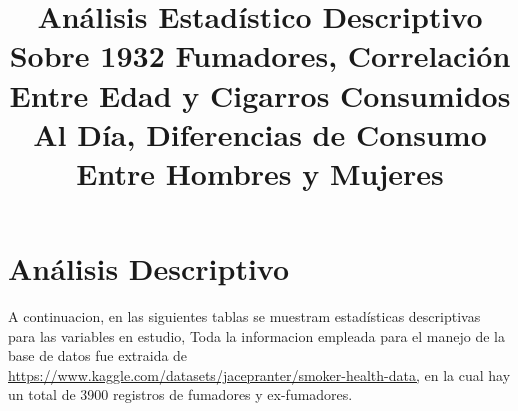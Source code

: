 \documentclass[
  stu,
  longtable,
  nolmodern,
  notxfonts,
  notimes,
  colorlinks=true,linkcolor=blue,citecolor=blue,urlcolor=blue]{apa7}
\title{Análisis Estadístico Descriptivo Sobre 1932 Fumadores,
Correlación Entre Edad y Cigarros Consumidos Al Día, Diferencias de
Consumo Entre Hombres y Mujeres}
\begin{document}
\maketitle


\setcounter{secnumdepth}{-\maxdimen} %

\setlength\LTleft{0pt}


\section{Análisis Descriptivo}\label{anuxe1lisis-descriptivo}

A continuacion, en las siguientes tablas se muestram estadísticas
descriptivas para las variables en estudio, Toda la informacion empleada
para el manejo de la base de datos fue extraida de
\url{https://www.kaggle.com/datasets/jacepranter/smoker-health-data,} en
la cual hay un total de 3900 registros de fumadores y ex-fumadores.
\end{document}
